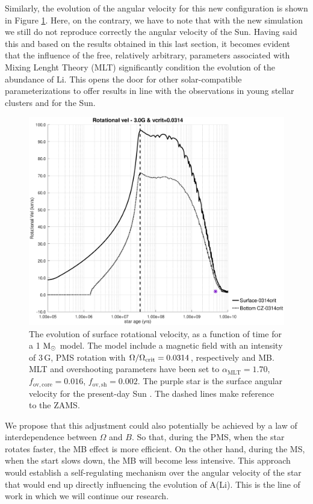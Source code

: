 \documentclass[fleqn,usenatbib]{mnras}
\begin{document}
Similarly, the evolution of the angular velocity for this new configuration is shown in Figure \ref{fig:rot_vel_var_vel_mlt_3_0g}. Here, on the contrary, we have to note that with the new simulation we still do not reproduce correctly the angular velocity of the Sun. Having said this and based on the results obtained in this last section, it becomes evident that the influence of the free, relatively arbitrary, parameters associated with Mixing Lenght Theory (MLT) significantly condition the evolution of the abundance of Li. This opens the door for other solar-compatible parameterizations to offer results in line with the observations in young stellar clusters and for the Sun. \par

\begin{figure}
	\includegraphics[trim = 30mm 15mm 20mm 15mm, clip,width=\columnwidth]{figures/rot_vel_3_0g_0314vc.eps}
    \caption{The evolution of surface rotational velocity, as a function of time for a 1 $\mathrm{M}_\odot$ model. The model include a magnetic field with an intensity of 3\,G, PMS rotation with $\Omega / \Omega_{\mathrm{crit}}=0.0314$, respectively and MB. MLT and overshooting parameters have been set to $\alpha_\mathrm{MLT}=1.70$, $f_\mathrm{ov,core}=0.016$, $f_\mathrm{ov,sh}=0.002$. The purple star is the surface angular velocity for the present-day Sun \citep{Gill2012}. The dashed lines make reference to the ZAMS.}
    \label{fig:rot_vel_var_vel_mlt_3_0g}
\end{figure}

We propose that this adjustment could also potentially be achieved by a law of interdependence between $\Omega$ and $B$. So that, during the PMS, when the star rotates faster, the MB effect is more efficient. On the other hand, during the MS, when the start slows down, the MB will become less intensive. This approach would establish a self-regulating mechanism over the angular velocity of the star that would end up directly influencing the evolution of A(Li). This is the line of work in which we will continue our research.\par
\end{document}
